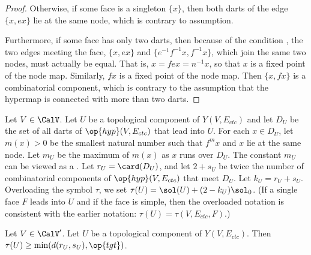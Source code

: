 \begin{proof}
Otherwise, if some face is a singleton $\{x\}$, then both darts
of the edge $\{x,e x\}$ lie at the same node, which is contrary to
assumption.

  Furthermore, if some face has only two darts, then because of the  condition
 , the two edges meeting the face, $\{x, e x\}$
  and $\{ e^{-1} f^{-1} x, f^{-1} x\}$, which join the same two nodes,
 must actually be equal.  That
  is, $ x = f e x = n^{-1} x$, so that $x$ is a fixed point of the node
  map.  Similarly, $f x$ is a fixed point of the node map.  Then $\{x,
  f x\}$ is a combinatorial component, which is contrary to the
  assumption that the hypermap is connected with more than two darts.
\end{proof}


\begin{definition}[$D_U$,~$m_U$,~$r_U$,~$s_U$,~$k_U$,~$\tau(U)$]
  Let $V\in \CalV$.  Let $U$ be a topological component of
  $Y(V,E_{ctc})$ and let $D_U$ be the set of all darts of $\op{hyp}(V,E_{ctc})$
 that lead into
  $U$.   For each
  $x\in D_U$, let $m(x) >0$ be the smallest natural number such that
  $f^{m} x$ and $x$ lie at the same node.  Let $m_U$ be the maximum of
  $m(x)$  as $x$ runs over $D_U$.  The constant $m_U$ can be viewed as
  a .  
Let $r_U = \card(D_U)$, and let $2+s_U$ be twice the
  number of combinatorial components of $\op{hyp}(V,E_{ctc})$ that
  meet $D_U$.  Let $k_U=r_U+s_U$.  Overloading the symbol $\tau$, we
  set $\tau(U) = \sol(U) +  (2-k_U)\sol_0$.   (If a single  face $F$ leads into
  $U$ and if the face is simple, then the overloaded notation is consistent
with the earlier notation: $\tau(U) = \tau(V,E_{ctc},F)$.)
%
\end{definition}

\begin{lemma}\label{lemma:tauU'}
  Let $V\in \CalV'$.
Let $U$ be a topological component of
  $Y(V,E_{ctc})$.   Then $\tau(U)\ge \min(d(r_U,s_U),\op{tgt})$.
\end{lemma}

